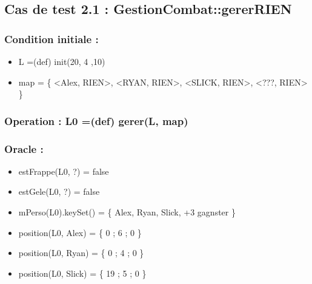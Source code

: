 \documentclass[11pt]{article}
\begin{document}
\subsection{Cas de test 2.1 : GestionCombat::gererRIEN}
\label{sec-1.2}

\subsubsection{Condition initiale :}
\label{sec-1.2.1}

\begin{itemize}

\item L =(def) init(20, 4 ,10)\\
\label{sec-1.2.1.1}


\item map = \{ <Alex, RIEN>, <RYAN, RIEN>, <SLICK, RIEN>, <???, RIEN> \}\\
\label{sec-1.2.1.2}

\end{itemize} %
\subsubsection{Operation : L0 =(def) gerer(L, map)}
\label{sec-1.2.2}

\subsubsection{Oracle :}
\label{sec-1.2.3}

\begin{itemize}

\item estFrappe(L0, ?) = false\\
\label{sec-1.2.3.1}


\item estGele(L0, ?) = false\\
\label{sec-1.2.3.2}


\item mPerso(L0).keySet() = \{ Alex, Ryan, Slick, +3 gagnster \}\\
\label{sec-1.2.3.3}


\item position(L0, Alex) = \{ 0 ; 6 ; 0 \}\\
\label{sec-1.2.3.4}


\item position(L0, Ryan) = \{ 0 ; 4 ; 0 \}\\
\label{sec-1.2.3.5}


\item position(L0, Slick) = \{ 19 ; 5 ; 0 \}\\
\label{sec-1.2.3.6}


\end{itemize} %
\end{document}
